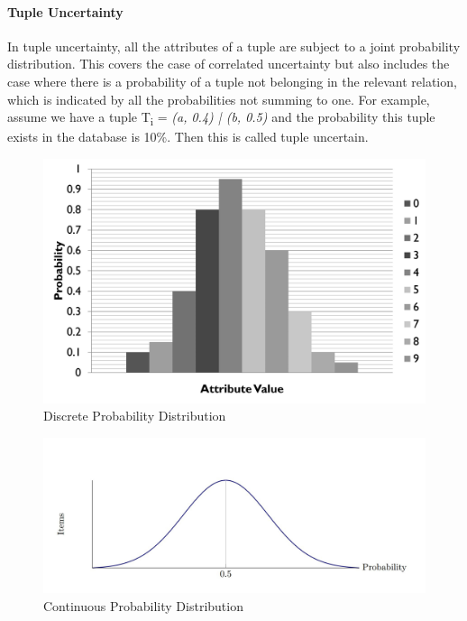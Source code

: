 \paragraph{Tuple Uncertainty}
In tuple uncertainty, all the attributes of a tuple are subject to a joint probability distribution. This covers the case of correlated uncertainty but also includes the case where there is a probability of a tuple not belonging in the relevant relation, which is indicated by all the probabilities not summing to one. For example, assume we have a tuple T\textsubscript{i} = \emph{(a, 0.4) | (b, 0.5)} and the probability this tuple exists in the database is 10\%. Then this is called tuple uncertain.
        \begin{figure}
        \centering
            \includegraphics[width=1\textwidth]{../images/d_probability}
        \caption{Discrete Probability Distribution}
        \label{figure:d_probability}
        \end{figure}
        \begin{figure}
        \centering
            \includegraphics[width=1\textwidth]{../images/c_probability}
        \caption{Continuous Probability Distribution}
        \label{figure:c_probability}
        \end{figure}
